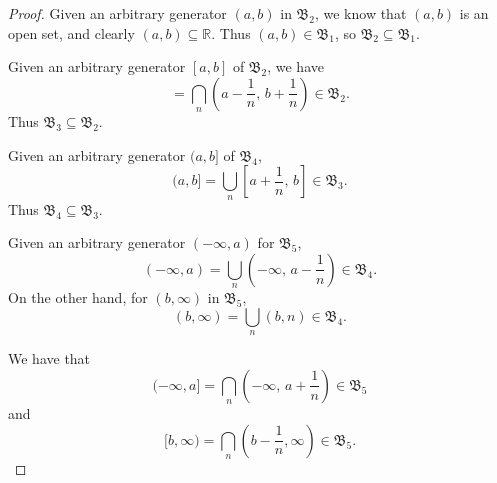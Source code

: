 \documentclass[notoc,notitlepage]{tufte-book}
\begin{document}
\begin{proof}
  Given an arbitrary generator $(a, b)$ in $\mathfrak{B}_2$,
  we know that $(a, b)$ is an open set,
  and clearly $(a, b) \subseteq \mathbb{R}$.
  Thus $(a, b) \in \mathfrak{B}_1$,
  so $\mathfrak{B}_2 \subseteq \mathfrak{B}_1$.

  \noindent
  Given an arbitrary generator $[a, b]$ of $\mathfrak{B}_2$,
  we have
  \begin{equation*}
    [a, b] = \bigcap_{n} \left( a - \frac{1}{n},\, b + \frac{1}{n} \right)
      \in \mathfrak{B}_2.
  \end{equation*}
  Thus $\mathfrak{B}_3 \subseteq \mathfrak{B}_2$.

  \noindent
  Given an arbitrary generator $(a, b]$ of $\mathfrak{B}_4$,
  \begin{equation*}
    (a, b] = \bigcup_{n} \left[ a + \frac{1}{n},\, b \right]
      \in \mathfrak{B}_3.
  \end{equation*}
  Thus $\mathfrak{B}_4 \subseteq \mathfrak{B}_3$.

  \noindent
  Given an arbitrary generator $(-\infty, a)$ for $\mathfrak{B}_5$,
  \begin{equation*}
    (-\infty, a) = \bigcup_{n} \left( -\infty,\, a - \frac{1}{n} \right)
      \in \mathfrak{B}_4.
  \end{equation*}
  On the other hand, for $(b, \infty)$ in $\mathfrak{B}_5$,
  \begin{equation*}
    (b, \infty) = \bigcup_{n} (b, n) \in \mathfrak{B}_4.
  \end{equation*}

  \noindent
  We have that
  \begin{equation*}
    (-\infty, a] = \bigcap_{n} \left( -\infty,\, a + \frac{1}{n} \right)
      \in \mathfrak{B}_5
  \end{equation*}
  and
  \begin{equation*}
    [b, \infty) = \bigcap_{n} \left( b - \frac{1}{n}, \infty \right)
      \in \mathfrak{B}_5.
  \end{equation*}


\end{proof}
\end{document}
